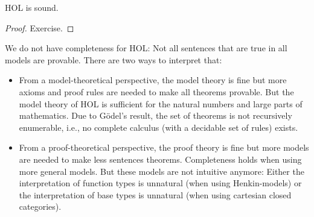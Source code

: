 \begin{theorem}
HOL is sound.
\end{theorem}
\begin{proof}
Exercise.
\end{proof}

We do not have completeness for HOL: Not all sentences that are true in all models are provable. There are two ways to interpret that:
\begin{itemize}
	\item From a model-theoretical perspective, the model theory is fine but more axioms and proof rules are needed to make all theorems provable. But the model theory of HOL is sufficient for the natural numbers and large parts of mathematics. Due to G\"odel's result, the set of theorems is not recursively enumerable, i.e., no complete calculus (with a decidable set of rules) exists.
	\item From a proof-theoretical perspective, the proof theory is fine but more models are needed to make less sentences theorems. Completeness holds when using more general models. But these models are not intuitive anymore: Either the interpretation of function types is unnatural (when using Henkin-models) or the interpretation of base types is unnatural (when using cartesian closed categories).
\end{itemize}
